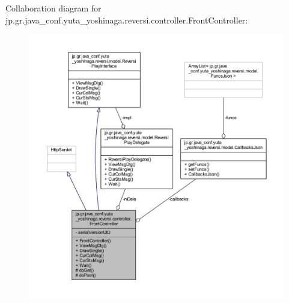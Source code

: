 Collaboration diagram for jp.\+gr.\+java\+\_\+conf.\+yuta\+\_\+yoshinaga.\+reversi.\+controller.\+Front\+Controller\+:\nopagebreak
\begin{figure}[H]
\begin{center}
\leavevmode
\includegraphics[width=350pt]{classjp_1_1gr_1_1java__conf_1_1yuta__yoshinaga_1_1reversi_1_1controller_1_1_front_controller__coll__graph}
\end{center}
\end{figure}
